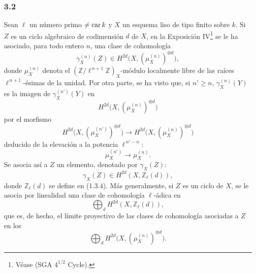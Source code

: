 \subsubsection*{3.2}
Sean \(\ell\) un número primo \(\ne\operatorname{car} k\) y \(X\) un esquema liso de tipo finito sobre \(k\). Si \(Z\) es un ciclo algebraico de codimensión \(d\) de \(X\), en la Exposición IV\footnote{Véase (SGA \(4^{1/2}\) Cycle).} se le ha asociado, para todo entero \(n\), una clase de cohomología
\[
\gamma_X^{(n)}(Z)\in H^{2d}\bigl(X,(\mu_X^{(n)})^{\otimes d}\bigr),
\]
donde \(\mu_X^{(n)}\) denota el \((\mathbb Z/\ell^{\,n+1}\mathbb Z)_X\)-módulo localmente libre de las raíces \(\ell^{\,n+1}\)-ésimas de la unidad. Por otra parte, se ha visto que, si \(n'\ge n\), \(\gamma_X^{(n)}(Y)\) es la imagen de \(\gamma_X^{(n')}(Y)\) en
\[
H^{2d}\bigl(X,(\mu_X^{(n)})^{\otimes d}\bigr)
\]
por el morfismo
\[
H^{2d}\bigl(X,(\mu_X^{(n')})^{\otimes d}\bigr)
\longrightarrow
H^{2d}\bigl(X,(\mu_X^{(n)})^{\otimes d}\bigr)
\]
deducido de la elevación a la potencia \(\ell^{\,n'-n}\):
\[
\mu_X^{(n')}\longrightarrow \mu_X^{(n)}.
\]
Se asocia así a \(Z\) un elemento, denotado por \(\gamma_X(Z)\):
\[
\gamma_X(Z)\in H^{2d}(X,\mathbb Z_\ell(d)),
\]
donde \(\mathbb Z_\ell(d)\) se define en (1.3.4). Más generalmente, si \(Z\) es un ciclo de \(X\), se le asocia por linealidad una clase de cohomología \(\ell\)-ádica en
\[
\bigoplus_d H^{2d}(X,\mathbb Z_\ell(d)),
\]
que es, de hecho, el límite proyectivo de las clases de cohomología asociadas a \(Z\) en los
\[
\bigoplus_d H^{2d}\bigl(X,(\mu_X^{(n)})^{\otimes d}\bigr).
\]
